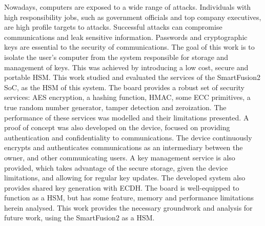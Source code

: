 \noindent Nowadays, computers are exposed to a wide range of attacks. Individuals with high responsibility jobs, such as government officials and top company executives, are high profile targets to attacks. Successful attacks can compromise communications and leak sensitive information. Passwords and cryptographic keys are essential to the security of communications. The goal of this work is to isolate the user's computer from the system responsible for storage and management of keys. This was achieved by introducing a low cost, secure and portable \ac{HSM}. This work studied and evaluated the services of the SmartFusion2 \ac{SoC}, as the HSM of this system. The board provides a robust set of security services: AES encryption, a hashing function, HMAC, some ECC primitives, a true random number generator, tamper detection and zeroization. The performance of these services was modelled and their limitations presented. A proof of concept was also developed on the device, focused on providing authentication and confidentiality to communications. The device continuously encrypts and authenticates communications as an intermediary between the owner, and other communicating users. A key management service is also provided, which takes advantage of the secure storage, given the device limitations, and allowing for regular key updates. The developed system also provides shared key generation with ECDH. The board is well-equipped to function as a HSM, but has some feature, memory and performance limitations herein analysed. This work provides the necessary groundwork and analysis for future work, using the SmartFusion2 as a HSM.
